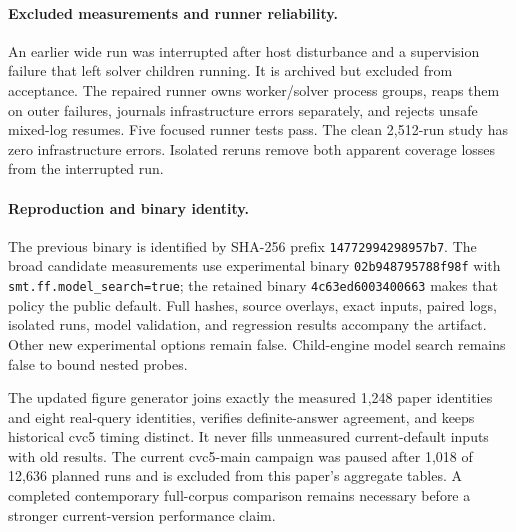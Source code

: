 \documentclass[runningheads]{llncs}
\newcommand{\flag}[1]{\texttt{#1}}
\begin{document}
\paragraph{Excluded measurements and runner reliability.}
An earlier wide run was interrupted after host disturbance and a supervision
failure that left solver children running. It is archived but excluded from
acceptance. The repaired runner owns worker/solver process groups, reaps them
on outer failures, journals infrastructure errors separately, and rejects
unsafe mixed-log resumes. Five focused runner tests pass. The clean 2,512-run
study has zero infrastructure errors. Isolated reruns remove both apparent
coverage losses from the interrupted run.

\paragraph{Reproduction and binary identity.}
The previous binary is identified by SHA-256 prefix \texttt{14772994298957b7}.
The broad candidate measurements use experimental binary
\texttt{02b948795788f98f} with \flag{smt.ff.model\_search=true}; the retained
binary \texttt{4c63ed6003400663} makes that policy the public default. Full hashes,
source overlays, exact inputs, paired logs, isolated runs, model validation,
and regression results accompany the artifact. Other new experimental options
remain false. Child-engine model search remains false to bound nested probes.

The updated figure generator joins exactly the measured 1,248 paper identities
and eight real-query identities, verifies definite-answer agreement, and keeps
historical cvc5 timing distinct. It never fills unmeasured current-default
inputs with old results. The current cvc5-main campaign was paused after
1,018 of 12,636 planned runs and is excluded from this paper's aggregate tables.
A completed contemporary full-corpus comparison remains necessary before a
stronger current-version performance claim.
\end{document}
